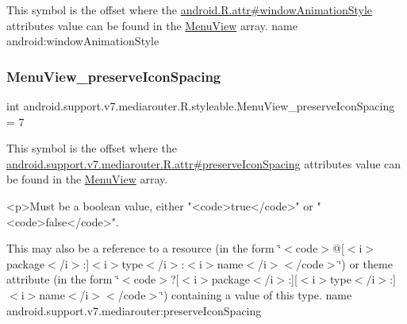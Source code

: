 This symbol is the offset where the \hyperlink{}{android.\+R.\+attr\#window\+Animation\+Style} attribute\textquotesingle{}s value can be found in the \hyperlink{classandroid_1_1support_1_1v7_1_1mediarouter_1_1R_1_1styleable_a1d8b1d577f8163d3bb95f228f10016c7}{Menu\+View} array.  name android\+:window\+Animation\+Style \mbox{\label{classandroid_1_1support_1_1v7_1_1mediarouter_1_1R_1_1styleable_ae65c88e6a427903c40bab472037f77a2}} 
\subsubsection{\texorpdfstring{Menu\+View\+\_\+preserve\+Icon\+Spacing}{MenuView\_preserveIconSpacing}}
{\footnotesize\ttfamily int android.\+support.\+v7.\+mediarouter.\+R.\+styleable.\+Menu\+View\+\_\+preserve\+Icon\+Spacing = 7\hspace{0.3cm}{\ttfamily [static]}}

This symbol is the offset where the \hyperlink{classandroid_1_1support_1_1v7_1_1mediarouter_1_1R_1_1attr_aa19f437997c712d66bbb1c7d5c68bd0b}{android.\+support.\+v7.\+mediarouter.\+R.\+attr\#preserve\+Icon\+Spacing} attribute\textquotesingle{}s value can be found in the \hyperlink{classandroid_1_1support_1_1v7_1_1mediarouter_1_1R_1_1styleable_a1d8b1d577f8163d3bb95f228f10016c7}{Menu\+View} array.

\begin{DoxyVerb}      <p>Must be a boolean value, either "<code>true</code>" or "<code>false</code>".
\end{DoxyVerb}
 

This may also be a reference to a resource (in the form \char`\"{}$<$code$>$@\mbox{[}$<$i$>$package$<$/i$>$\+:\mbox{]}$<$i$>$type$<$/i$>$\+:$<$i$>$name$<$/i$>$$<$/code$>$\char`\"{}) or theme attribute (in the form \char`\"{}$<$code$>$?\mbox{[}$<$i$>$package$<$/i$>$\+:\mbox{]}\mbox{[}$<$i$>$type$<$/i$>$\+:\mbox{]}$<$i$>$name$<$/i$>$$<$/code$>$\char`\"{}) containing a value of this type.  name android.\+support.\+v7.\+mediarouter\+:preserve\+Icon\+Spacing \mbox{\label{classandroid_1_1support_1_1v7_1_1mediarouter_1_1R_1_1styleable_a9216c77e145f14d4fdd264c2381fce44}} 
